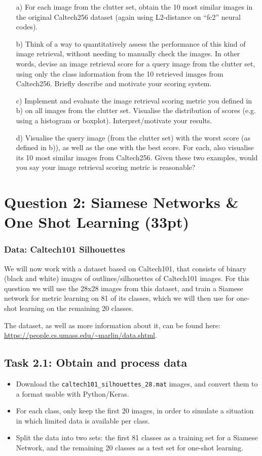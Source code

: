 \documentclass[a4paper,twoside,10pt]{article}
\begin{document}
\begin{itemize}
  \item[a)] For each image from the clutter set, obtain the 10 most similar images in the original Caltech256 dataset (again using L2-distance on ``fc2'' neural codes).
  \item[b)] Think of a way to quantitatively assess the performance of this kind of image retrieval, without needing to manually check the images. In other words, devise an image retrieval score for a query image from the clutter set, using only the class information from the 10 retrieved images from Caltech256. Briefly describe and motivate your scoring system.
  \item[c)] Implement and evaluate the image retrieval scoring metric you defined in b) on all images from the clutter set. Visualise the distribution of scores (e.g. using a histogram or boxplot). Interpret/motivate your results.
  \item[d)] Visualise the query image (from the clutter set) with the worst score (as defined in b)), as well as the one with the best score. For each, also visualise its 10 most similar images from Caltech256. Given these two examples, would you say your image retrieval scoring metric is reasonable?
\end{itemize}



\section*{Question 2: Siamese Networks \& One Shot Learning (33pt)}
\subsubsection*{Data: Caltech101 Silhouettes}
We will now work with a dataset based on Caltech101, that consists of binary (black and white) images of outlines/silhouettes of Caltech101 images. For this question we will use the 28x28 images from this dataset, and train a Siamese network for metric learning on 81 of its classes, which we will then use for one-shot learning on the remaining 20 classes.

The dataset, as well as more information about it, can be found here: \url{https://people.cs.umass.edu/~marlin/data.shtml}.

\subsection*{Task 2.1: Obtain and process data}
\begin{itemize}
  \item Download the \texttt{caltech101\_silhouettes\_28.mat} images, and convert them to a format usable with Python/Keras.
  \item For each class, only keep the first 20 images, in order to simulate a situation in which limited data is available per class.
  \item Split the data into two sets: the first 81 classes as a training set for a Siamese Network, and the remaining 20 classes as a test set for one-shot learning.
\end{itemize}
\end{document}
